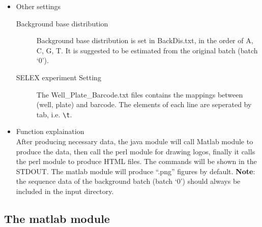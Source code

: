 \documentclass[a4paper,10pt]{article}
\begin{document}
\begin{itemize}
\item Other settings
\begin{description}
 \item[Background base distribution] Background base distribution is set in BackDis.txt, in the order of A, C, G, T. It is 
                                     suggested to be estimated from the original batch (batch `0').
 \item[SELEX experiment Setting] The Well\_Plate\_Barcode.txt files contains the mappings between (well, plate) and barcode.
                                 The elements of each line are seperated by tab, i.e. \verb+\t+.
\end{description}

\item Function explaination \\
After producing necessary data, the java module will call Matlab module to produce the data, then call the perl module for drawing logos,
finally it calls the perl module to produce HTML files. The commands will be shown in the STDOUT. The matlab module will produce ``.png'' figures by default. \textbf{Note}: the sequence data of the background batch (batch `0') should always be included in the input directory.

\end{itemize}


\subsection{The matlab module}
\end{document}
